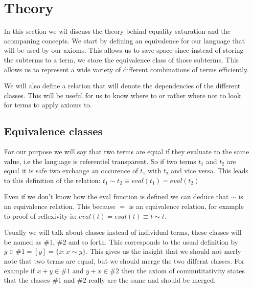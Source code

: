 



\section{Theory}

In this section we wil discuss the theory behind equality saturation and the acompaning concepts. We
start by defining an equivalence for our language that will be used by our axioms.
This allows us to save space since instead of storing the subterms to a term, we
store the equivalence class of those subterms. This allows us to represent a wide 
variety of different combinations of terms efficiently.

We will also define a relation
that will denote the dependencies of the different classes. This will be useful for us to know where to
or rather where not to look for terms to apply axioms to.
\subsection{Equivalence classes}


For our purpose we will say that two terms are equal if they evaluate to the same value, i.e the language
is referentiel transparent. So if two terms $t_1$ and $t_2$ are equal it is safe two exchange an occurence
of $t_1$ with $t_2$ and vice versa. This leads to this definition of the relation:
$t_1 \sim t_2 \equiv eval(t_1) = eval(t_2)$


Even if we don't know how the eval function is defined we can deduce that $\sim$ is an equivalence relation.
This because $=$ is an equivalence relation, for example to proof of reflexivity is:
$eval(t) = eval(t) \equiv t \sim t$.


Usually we will talk about classes instead of individual terms, these classes will
be named as \#1, \#2 and so forth. This corresponds to the usual definition by
$y \in \#1 = [y] = \{ x : x \sim y\}$. This gives us the insight that we should
not merly note that two terms are equal, but we should merge the two differnt classes.
For example if $x + y \in \#1$ and $y + x \in \#2$ then the axiom of commutitativity
states that the classes \#1 and \#2 really are the same and should be merged.





